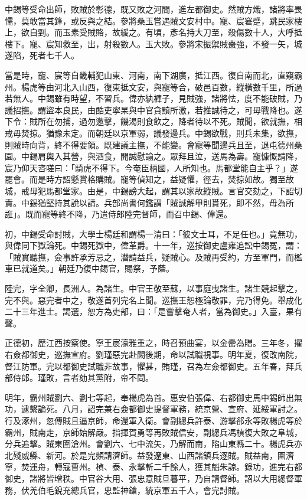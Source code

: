 \begin{pinyinscope}
中錫等受命出師，敗賊於彰德，既又敗之河間，進左都御史。然賊方熾，諸將率畏懦，莫敢當其鋒，或反與之結。參將桑玉嘗遇賊文安村中。寵、宸窘蹙，跳民家樓上，欲自剄。而玉素受賊賂，故緩之。有頃，彥名持大刀至，殺傷數十人，大呼抵樓下。寵、宸知救至，出，射殺數人。玉大敗。參將宋振禦賊棗強，不發一矢，城遂陷，死者七千人。

當是時，寵、宸等自畿輔犯山東、河南，南下湖廣，抵江西。復自南而北，直窺霸州。楊虎等由河北入山西，復東抵文安，與寵等合，破邑百數，縱橫數千里，所過若無人。中錫雖有時望，不習兵。偉亦紈褲子，見賊強，諸將怯，度不能破賊，乃議招撫。謂盜本良民，由酷吏寧杲與中官貪黷所激，若推誠待之，可毋戰降也。遂下令：賊所在勿捕，過勿邀擊，饑渴則食飲之，降者待以不死。賊聞，欲就撫，相戒毋焚掠。猶豫未定。而朝廷以京軍弱，議發邊兵。中錫欲戰，則兵未集，欲撫，則賊時向背，終不得要領。既建議主撫，不能變。會寵等聞邊兵且至，退屯德州桑園。中錫肩輿入其營，與酒食，開誠慰諭之。眾拜且泣，送馬為壽。寵慷慨請降，宸乃仰天咨嗟曰：「騎虎不得下。今奄臣柄國，人所知也。馬都堂能自主乎？」遂罷會。而是時方詔懸賞格購賊。寵等偵知之，益疑懼，徑去，焚掠如故。獨至故城，戒毋犯馬都堂家。由是，中錫謗大起，謂其以家故縱賊。言官交劾之，下詔切責。中錫猶堅持其說以請。兵部尚書何鑑謂「賊誠解甲則貰死，即不然，毋為所誑」。既而寵等終不降，乃遣侍郎陸完督師，而召中錫、偉還。

初，中錫受命討賊，大學士楊廷和謂楊一清曰：「彼文士耳，不足任也。」竟無功，與偉同下獄論死。中錫死獄中，偉革爵。十一年，巡按御史盧雍追訟中錫冤，謂：「賊實聽撫，僉事許承芳忌之，潛請益兵，疑賊心。及賊再受約，方至軍門，而檻車已就道矣。」朝廷乃復中錫官，賜祭，予蔭。

陸完，字全卿，長洲人。為諸生。中官王敬至蘇，以事庭曳諸生。諸生競起擊之，完不與。惡完者中之，敬遂首列完名上聞。巡撫王恕極論敬罪，完乃得免。舉成化二十三年進士。謁選，恕方為吏部，曰：「是嘗擊奄人者，當為御史。」入臺，果有聲。

正德初，歷江西按察使。寧王宸濠雅重之，時召預曲宴，以金罍為贈。三年冬，擢右僉都御史，巡撫宣府。劉瑾惡完赴闕後期，命以試職視事。明年夏，復改南院，督江防軍。完以都御史試職非故事，懼甚，賄瑾，召為左僉都御史。五年春，拜兵部侍郎。瑾敗，言者劾其黨附，帝不問。

明年，霸州賊劉六、劉七等起，奉楊虎為首。惠安伯張偉、右都御史馬中錫師出無功，逮繫論死。八月，詔完兼右僉都御史提督軍務，統京營、宣府、延綏軍討之。行及涿州，忽傳賊且逼京師，命還軍入衛。會副總兵許泰、游擊郤永等敗楊虎等於霸州，賊南走，京師始解嚴。指揮賀勇等再敗賊信安，副總兵馮楨復大敗之阜城，分兵追擊。賊東圍滄州。會劉六、七中流矢，乃解而南，陷山東縣二十。楊虎兵亦北殘威縣、新河。於是完頻請濟師。益發遼東、山西諸鎮兵逐賊。賊益南，圍濟寧，焚運舟，轉寇曹州。楨、泰、永擊斬二千餘人，獲其魁朱諒。錄功，進完右都御史，諸將皆增秩。中官谷大用、張忠意賊旦暮平，乃自請督師。詔以大用總督軍務，伏羌伯毛銳充總兵官，忠監神鎗，統京軍五千人，會完討賊。


\end{pinyinscope}

